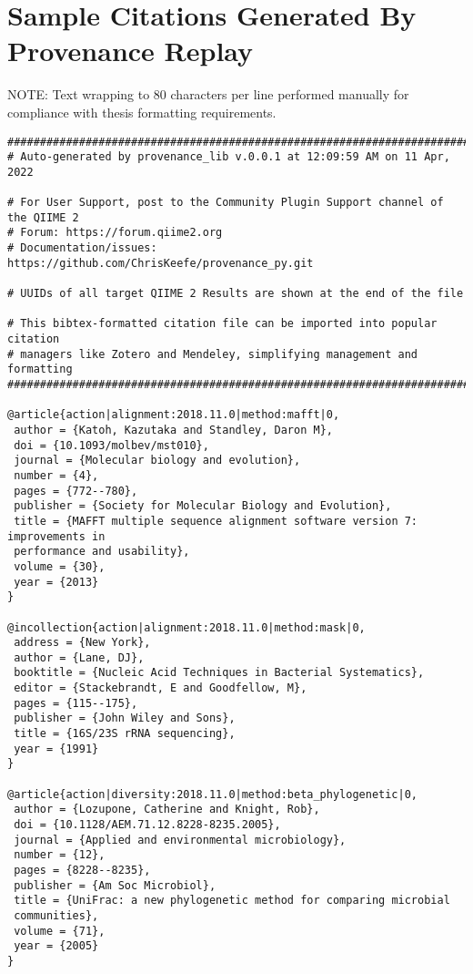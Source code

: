 \chapter{Sample Citations Generated By Provenance Replay}
\label{app:citationsOutput}

\noindent NOTE: Text wrapping to 80 characters per line performed manually for
compliance with thesis formatting requirements.

\begin{footnotesize}
\begin{verbatim}
###############################################################################
# Auto-generated by provenance_lib v.0.0.1 at 12:09:59 AM on 11 Apr, 2022

# For User Support, post to the Community Plugin Support channel of the QIIME 2
# Forum: https://forum.qiime2.org
# Documentation/issues: https://github.com/ChrisKeefe/provenance_py.git

# UUIDs of all target QIIME 2 Results are shown at the end of the file

# This bibtex-formatted citation file can be imported into popular citation
# managers like Zotero and Mendeley, simplifying management and formatting
###############################################################################

@article{action|alignment:2018.11.0|method:mafft|0,
 author = {Katoh, Kazutaka and Standley, Daron M},
 doi = {10.1093/molbev/mst010},
 journal = {Molecular biology and evolution},
 number = {4},
 pages = {772--780},
 publisher = {Society for Molecular Biology and Evolution},
 title = {MAFFT multiple sequence alignment software version 7: improvements in
 performance and usability},
 volume = {30},
 year = {2013}
}

@incollection{action|alignment:2018.11.0|method:mask|0,
 address = {New York},
 author = {Lane, DJ},
 booktitle = {Nucleic Acid Techniques in Bacterial Systematics},
 editor = {Stackebrandt, E and Goodfellow, M},
 pages = {115--175},
 publisher = {John Wiley and Sons},
 title = {16S/23S rRNA sequencing},
 year = {1991}
}

@article{action|diversity:2018.11.0|method:beta_phylogenetic|0,
 author = {Lozupone, Catherine and Knight, Rob},
 doi = {10.1128/AEM.71.12.8228-8235.2005},
 journal = {Applied and environmental microbiology},
 number = {12},
 pages = {8228--8235},
 publisher = {Am Soc Microbiol},
 title = {UniFrac: a new phylogenetic method for comparing microbial
 communities},
 volume = {71},
 year = {2005}
}


\end{verbatim}
\end{footnotesize}

